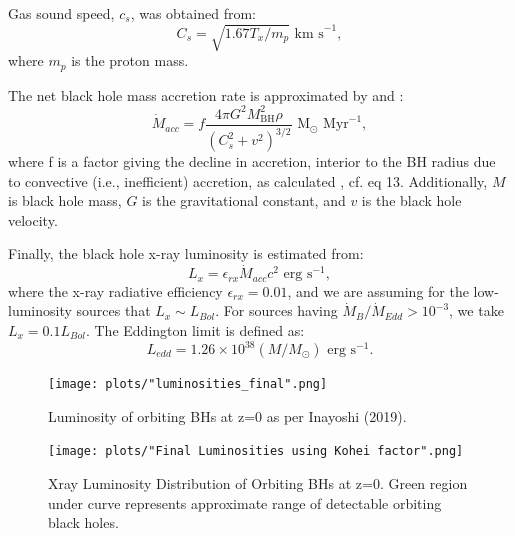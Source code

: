 \documentclass[fleqn,usenatbib,useAMS]{mnras}
\begin{document}
Gas sound speed, $c_s$, was obtained from:
\begin{equation}
    C_s = \sqrt{1.67T_x/m_p} \text{  km s}^{-1},
\end{equation}
where $m_p$ is the proton mass.

The net black hole mass accretion rate is approximated by \citet{2018MNRAS.476.1412I} and \citet{2019MNRAS.486.5377I}:
\begin{equation}
    \dot{M}_{acc} = f\frac{4{\pi}G^2M_\mathrm{BH}^2\rho}{(C_s^2+v^2)^{3/2}} \text{  M}_\odot \text{ Myr}^{-1},
\end{equation}
where f is a factor giving the decline in accretion, interior to the BH radius due to convective (i.e., inefficient) accretion, as calculated \citet{2019MNRAS.486.5377I}, cf. eq 13.  Additionally, $M$ is black hole mass, $G$ is the gravitational constant, and $v$ is the black hole velocity.

Finally, the black hole x-ray luminosity is estimated from:
\begin{equation}
    L_x = \epsilon_{rx}\dot{M}_{acc}c^2 \text{  erg s}^{-1},
\end{equation}
where the x-ray radiative efficiency ${\epsilon}_{rx}=0.01$, and we are assuming for the low-luminosity sources that $L_x{\sim}L_{Bol}$.  For sources having $\dot{M}_B/\dot{M}_{Edd} > 10^{-3}$, we take $L_x=0.1L_{Bol}$.
The Eddington limit is defined as:
\begin{equation}
    L_{edd} = 1.26 \times 10^{38} (M/M_{\odot}) \text{  erg s}^{-1}.
\end{equation}


\begin{figure}
\begin{center}
\texttt{[image: plots/"luminosities\_final".png]}
\caption{Luminosity of orbiting BHs at z=0 as per Inayoshi (2019).}
\label{fig:loobhs}
\end{center}
\end{figure}

\begin{figure}
\begin{center}
\texttt{[image: plots/"Final Luminosities using Kohei factor".png]}
\caption{Xray Luminosity Distribution of Orbiting BHs at z=0.  Green region under curve represents approximate range of detectable orbiting black holes.}
\label{fig:ldobhs}
\end{center}
\end{figure}
\end{document}
